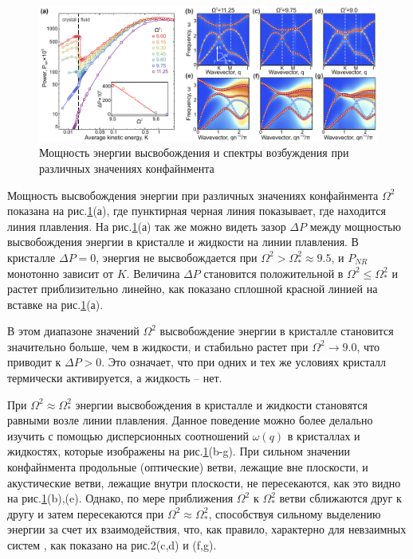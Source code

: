 \begin{figure}[htbp]
\centerline{\includegraphics[width=1.0\linewidth]{Ris/DPD-Figure2.pdf}}
\caption{Мощность энергии высвобождения и спектры возбуждения при различных значениях конфайнмента}
\label{DPD-Figure2}
\end{figure}

Мощность высвобождения энергии при различных значениях конфайнмента $\Omega^2$ показана на рис.\ref{DPD-Figure2}(а), где пунктирная черная линия показывает, где находится линия плавления. На рис.\ref{DPD-Figure2}(а) 
так же можно видеть зазор $\Delta P$ между мощностью высвобождения энергии в кристалле и жидкости на линии плавления. В кристалле $\Delta P = 0$, энергия не высвобождается при $\Omega^2 > \Omega^2_{*} \approx 9.5$, и $P_{NR}$ монотонно зависит от $K$. Величина $\Delta P$ становится положительной в $\Omega^2 \leq \Omega^2_{*}$ и 
растет приблизительно линейно, как показано сплошной красной линией на вставке на рис.\ref{DPD-Figure2}(а).

В этом диапазоне значений $\Omega^2$ высвобождение энергии в кристалле становится значительно больше, чем в жидкости, и стабильно растет
при $\Omega^2 \rightarrow 9.0$, что приводит к $\Delta P > 0$. Это означает, что при одних и тех же условиях кристалл термически активируется, а жидкость -- нет. 



При $\Omega^2 \approx \Omega^2_{*}$ энергии высвобождения в кристалле и жидкости становятся
равными возле линии плавления. 
Данное поведение можно более делально изучить с помощью дисперсионных соотношений $\omega(q)$ в кристаллах и жидкостях, которые изображены на рис.\ref{DPD-Figure2}(b-g).
При сильном значении конфайнмента продольные (оптические) ветви, лежащие вне плоскости, и акустические ветви, лежащие внутри плоскости, не пересекаются, как это видно на рис.\ref{DPD-Figure2}(b),(e). 
Однако, по мере приближения $\Omega^2$ к $\Omega^2_{*}$ ветви сближаются друг к другу и затем
пересекаются при $\Omega^2 \approx \Omega^2_{*}$, способствуя сильному выделению энергии за счет их взаимодействия, что, как правило, характерно для невзаимных систем \cite{10.1103/physreve.63.016409, 10.1103/physrevlett.104.195001, 10.1103/PhysRevLett.113.135002, 10.3367/ufne.2019.01.038520}, как показано на рис.2(c,d) и (f,g). 


